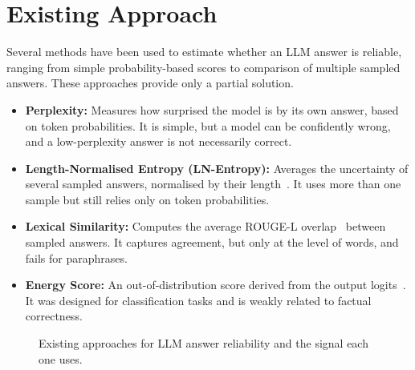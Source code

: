 \documentclass[journal]{IEEEtran}
\begin{document}
\section{Existing Approach}
Several methods have been used to estimate whether an LLM answer is reliable, ranging from simple probability-based scores to comparison of multiple sampled answers. These approaches provide only a partial solution.
\begin{itemize}
\item \textbf{Perplexity:} Measures how surprised the model is by its own answer, based on token probabilities. It is simple, but a model can be confidently wrong, and a low-perplexity answer is not necessarily correct.
\item \textbf{Length-Normalised Entropy (LN-Entropy):} Averages the uncertainty of several sampled answers, normalised by their length~\cite{malinin2021uncertainty}. It uses more than one sample but still relies only on token probabilities.
\item \textbf{Lexical Similarity:} Computes the average ROUGE-L overlap~\cite{lin2004rouge} between sampled answers. It captures agreement, but only at the level of words, and fails for paraphrases.
\item \textbf{Energy Score:} An out-of-distribution score derived from the output logits~\cite{liu2020energy}. It was designed for classification tasks and is weakly related to factual correctness.
\end{itemize}

\begin{figure}[!t]
\centering
{}
\caption{Existing approaches for LLM answer reliability and the signal each one uses.}
\label{fig:existing}
\end{figure}
\end{document}
